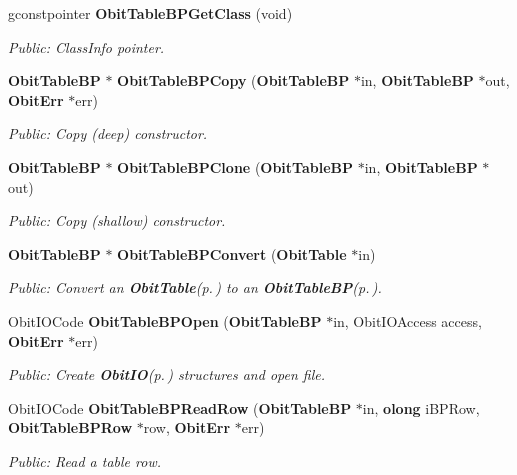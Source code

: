 \begin{CompactItemize}
gconstpointer {\bf Obit\-Table\-BPGet\-Class} (void)
\begin{CompactList}\small\item\em Public: Class\-Info pointer. \item\end{CompactList}\item 
{\bf Obit\-Table\-BP} $\ast$ {\bf Obit\-Table\-BPCopy} ({\bf Obit\-Table\-BP} $\ast$in, {\bf Obit\-Table\-BP} $\ast$out, {\bf Obit\-Err} $\ast$err)
\begin{CompactList}\small\item\em Public: Copy (deep) constructor. \item\end{CompactList}\item 
{\bf Obit\-Table\-BP} $\ast$ {\bf Obit\-Table\-BPClone} ({\bf Obit\-Table\-BP} $\ast$in, {\bf Obit\-Table\-BP} $\ast$out)
\begin{CompactList}\small\item\em Public: Copy (shallow) constructor. \item\end{CompactList}\item 
{\bf Obit\-Table\-BP} $\ast$ {\bf Obit\-Table\-BPConvert} ({\bf Obit\-Table} $\ast$in)
\begin{CompactList}\small\item\em Public: Convert an {\bf Obit\-Table}{\rm (p.\,\pageref{structObitTable})} to an {\bf Obit\-Table\-BP}{\rm (p.\,\pageref{structObitTableBP})}. \item\end{CompactList}\item 
Obit\-IOCode {\bf Obit\-Table\-BPOpen} ({\bf Obit\-Table\-BP} $\ast$in, Obit\-IOAccess access, {\bf Obit\-Err} $\ast$err)
\begin{CompactList}\small\item\em Public: Create {\bf Obit\-IO}{\rm (p.\,\pageref{structObitIO})} structures and open file. \item\end{CompactList}\item 
Obit\-IOCode {\bf Obit\-Table\-BPRead\-Row} ({\bf Obit\-Table\-BP} $\ast$in, {\bf olong} i\-BPRow, {\bf Obit\-Table\-BPRow} $\ast$row, {\bf Obit\-Err} $\ast$err)
\begin{CompactList}\small\item\em Public: Read a table row. \item\end{CompactList}\item 

\end{CompactItemize}
